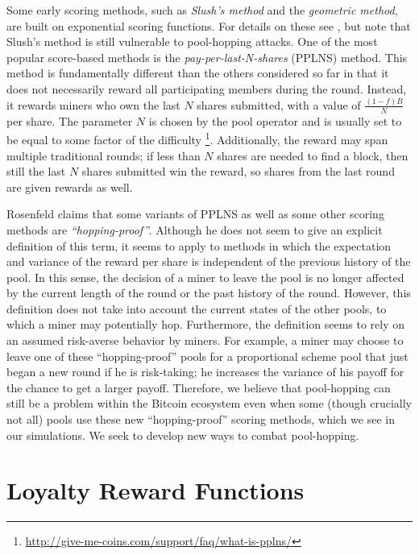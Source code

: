 \documentclass{article}
\theoremstyle{plain}
\theoremstyle{definition}
\begin{document}
Some early scoring methods, such as \emph{Slush's method} and the \emph{geometric method}, are built on exponential scoring functions. For details on these see \cite{Rosefeld2011}, but note that Slush's method is still vulnerable to pool-hopping attacks. One of the most popular score-based methods is the \emph{pay-per-last-N-shares} (PPLNS) method. This method is fundamentally different than the others considered so far in that it does not necessarily reward all participating members during the round. Instead, it rewards miners who own the last $N$ shares submitted, with a value of $\frac{(1-f)B}{N}$ per share. The parameter $N$ is chosen by the pool operator and is usually set to be equal to some factor of the difficulty \footnote{\url{http://give-me-coins.com/support/faq/what-is-pplns/}}. Additionally, the reward may span multiple traditional rounds; if less than $N$ shares are needed to find a block, then still the last $N$ shares submitted win the reward, so shares from the last round are given rewards as well\cite{tim}.

Rosenfeld claims that some variants of PPLNS as well as some other scoring methods are \emph{``hopping-proof''}\cite{Rosefeld2011}. Although he does not seem to give an explicit definition of this term, it seems to apply to methods in which the expectation and variance of the reward per share is independent of the previous history of the pool. In this sense, the decision of a miner to leave the pool is no longer affected by the current length of the round or the past history of the round. However, this definition does not take into account the current states of the other pools, to which a miner may potentially hop. Furthermore, the definition seems to rely on an assumed risk-averse behavior by miners. For example, a miner may choose to leave one of these ``hopping-proof'' pools for a proportional scheme pool that just began a new round if he is risk-taking; he increases the variance of his payoff for the chance to get a larger payoff. Therefore, we believe that pool-hopping can still be a problem within the Bitcoin ecosystem even when some (though crucially not all) pools use these new ``hopping-proof'' scoring methods, which we see in our simulations. We seek to develop new ways to combat pool-hopping.

\section{Loyalty Reward Functions}
\end{document}
